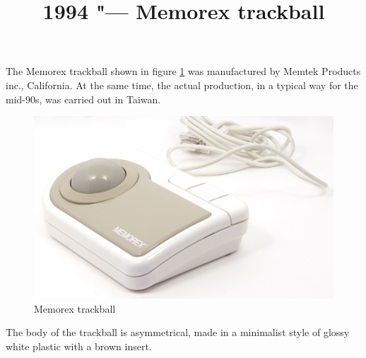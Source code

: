 \documentclass[11pt, a4paper]{article}
\begin{document}
\title{1994 "--- Memorex trackball}
\date{}
\maketitle
{}
The Memorex trackball shown in figure \ref{fig:MemorexPic} was manufactured by Memtek Products inc., California. At the same time, the actual production, in a typical way for the mid-90s, was carried out in Taiwan.

\begin{figure}[h]
    \centering
    \includegraphics[scale=0.55]{1994_memorex_trackball/pic_30.jpg}
    \caption{Memorex trackball}
    \label{fig:MemorexPic}
\end{figure}

The body of the trackball is asymmetrical, made in a minimalist style of glossy white plastic with a brown insert.
\end{document}
